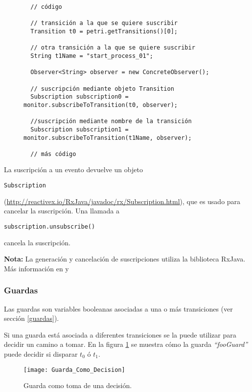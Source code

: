 \begin{figure}[H]
\centering
\begin{verbatim}
  // código
  
  // transición a la que se quiere suscribir
  Transition t0 = petri.getTransitions()[0]; 
  
  // otra transición a la que se quiere suscribir
  String t1Name = "start_process_01";
  
  Observer<String> observer = new ConcreteObserver();
  
  // suscripción mediante objeto Transition
  Subscription subscription0 = monitor.subscribeToTransition(t0, observer);
  
  //suscripción mediante nombre de la transición
  Subscription subscription1 = monitor.subscribeToTransition(t1Name, observer);
  
  // más código
\end{verbatim}
\end{figure}

La suscripción a un evento devuelve un objeto
\begin{verbatim}
Subscription
\end{verbatim} 
(\url{http://reactivex.io/RxJava/javadoc/rx/Subscription.html}),
que es usado para cancelar la suscripción.
Una llamada a
\begin{verbatim}
subscription.unsubscribe()
\end{verbatim} 
cancela la suscripción.

\begin{framed}
\textbf{Nota:} La generación y cancelación de suscripciones utiliza la
biblioteca RxJava. Más información en \cite{RxJava} y \cite{RxJavaJavadoc}
\end{framed}

\subsubsection{Guardas}

Las guardas son variables booleanas asociadas a una o más transiciones (ver
sección \ref{guardas}).

Si una guarda está asociada a diferentes transiciones se la puede utilizar para
decidir un camino a tomar. En la figura \ref{fig:guarda_como_decision} se
muestra cómo la guarda \textit{``fooGuard''} puede decidir si disparar $t_{0}$ ó
$t_{1}$.

\begin{figure}[H]
  \centering
  \texttt{[image: Guarda\_Como\_Decision]}
  \caption{Guarda como toma de una decisión.}
  \label{fig:guarda_como_decision}
\end{figure}

